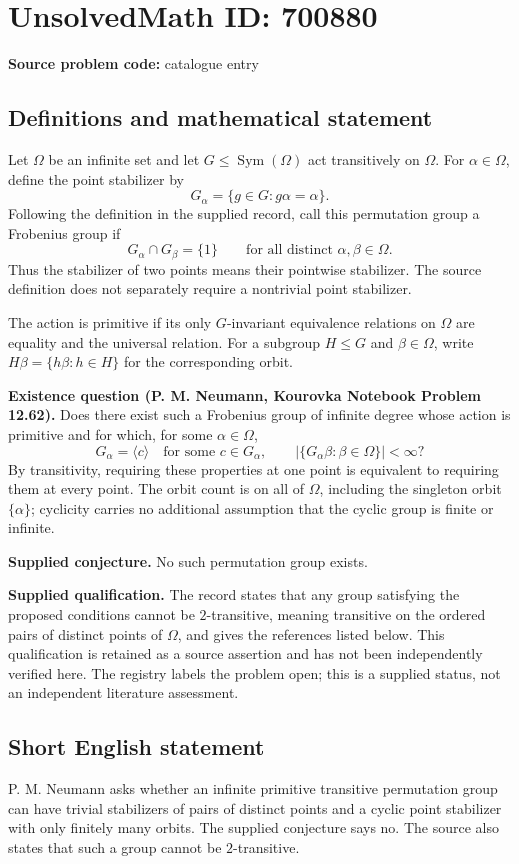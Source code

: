 \documentclass[11pt]{article}
\begin{document}
\section*{UnsolvedMath ID: 700880}
\textbf{Source problem code:} catalogue entry
\subsection{Definitions and mathematical statement}
Let \(\Omega\) be an infinite set and let \(G\leq\operatorname{Sym}(\Omega)\) act transitively on \(\Omega\). For \(\alpha\in\Omega\), define the point stabilizer by
\[
G_\alpha=\{g\in G:g\alpha=\alpha\}.
\]
Following the definition in the supplied record, call this permutation group a Frobenius group if
\[
G_\alpha\cap G_\beta=\{1\}\qquad\text{for all distinct }\alpha,\beta\in\Omega.
\]
Thus the stabilizer of two points means their pointwise stabilizer. The source definition does not separately require a nontrivial point stabilizer.

The action is primitive if its only \(G\)-invariant equivalence relations on \(\Omega\) are equality and the universal relation. For a subgroup \(H\leq G\) and \(\beta\in\Omega\), write \(H\beta=\{h\beta:h\in H\}\) for the corresponding orbit.

\textbf{Existence question (P. M. Neumann, Kourovka Notebook Problem 12.62).} Does there exist such a Frobenius group of infinite degree whose action is primitive and for which, for some \(\alpha\in\Omega\),
\[
G_\alpha=\langle c\rangle\quad\text{for some }c\in G_\alpha,
\qquad
\bigl|\{G_\alpha\beta:\beta\in\Omega\}\bigr|<\infty?
\]
By transitivity, requiring these properties at one point is equivalent to requiring them at every point. The orbit count is on all of \(\Omega\), including the singleton orbit \(\{\alpha\}\); cyclicity carries no additional assumption that the cyclic group is finite or infinite.

\textbf{Supplied conjecture.} No such permutation group exists.

\textbf{Supplied qualification.} The record states that any group satisfying the proposed conditions cannot be \(2\)-transitive, meaning transitive on the ordered pairs of distinct points of \(\Omega\), and gives the references listed below. This qualification is retained as a source assertion and has not been independently verified here. The registry labels the problem open; this is a supplied status, not an independent literature assessment.
\subsection{Short English statement}
P. M. Neumann asks whether an infinite primitive transitive permutation group can have trivial stabilizers of pairs of distinct points and a cyclic point stabilizer with only finitely many orbits. The supplied conjecture says no. The source also states that such a group cannot be \(2\)-transitive.
\end{document}
